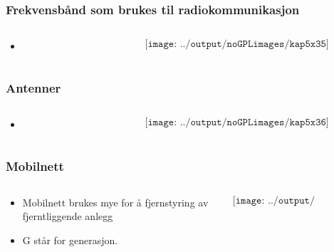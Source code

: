 \documentclass[aspectratio=169,xcolor=dvipsnames]{beamer}
\begin{document}
\begin{frame}
	\frametitle{Frekvensbånd som brukes til radiokommunikasjon}
	\begin{columns}
		\begin{column}{0.5\textwidth}

			\begin{itemize}
				\item      
			\end{itemize}

			
		\end{column}

		\begin{column}{0.5\textwidth}
	$$\texttt{[image: ../output/noGPLimages/kap5x35]}$$
		\end{column}
	\end{columns}
\end{frame}
\begin{frame}
	\frametitle{Antenner}
	\begin{columns}
		\begin{column}{0.5\textwidth}

			\begin{itemize}
				\item      
			\end{itemize}

			
		\end{column}

		\begin{column}{0.5\textwidth}
	$$\texttt{[image: ../output/noGPLimages/kap5x36]}$$
		\end{column}
	\end{columns}
\end{frame}
\begin{frame}
	\frametitle{Mobilnett}
	\begin{columns}
		\begin{column}{0.5\textwidth}

			\begin{itemize}
				\item Mobilnett brukes mye for å fjernstyring av fjerntliggende anlegg
				\item G står for generasjon. 

			\end{itemize}

			
		\end{column}

		\begin{column}{0.5\textwidth}
	$$\texttt{[image: ../output/noGPLimages/kap5x37]}$$
		\end{column}
	\end{columns}
\end{frame}
\end{document}
